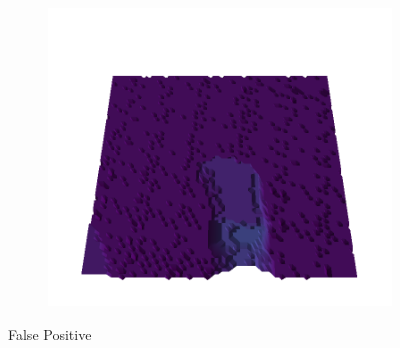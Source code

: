 \begin{figure}[H]
    \begin{subfigure}[b]{0.19\textwidth}
        \includegraphics[width=\linewidth]{../img/5/quarry/false_positive//patch-3d-majavi-colormap-4.png}
    \end{subfigure}  

\caption{False Positive}    
\end{figure}



